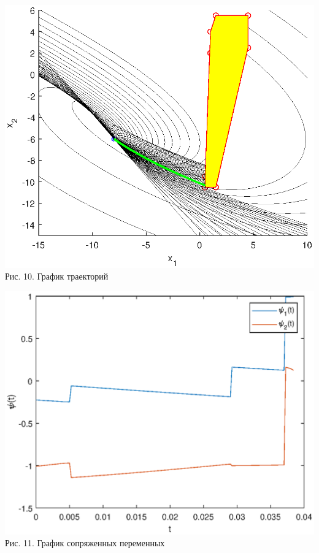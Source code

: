 \documentclass{article}
\theoremstyle{definition}
\begin{document}
\begin{center}
{\includegraphics[width=15cm]{example4.eps}}
{Рис. 10. График траекторий}
\end{center}

\begin{center}
{\includegraphics[width=15cm]{pexample4.eps}}
{Рис. 11. График сопряженных переменных}
\end{center}
\end{document}
